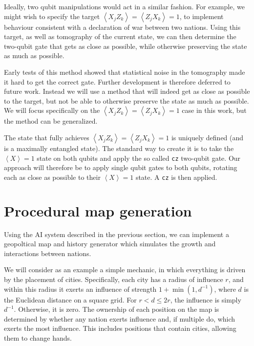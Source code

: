 \documentclass[conference]{IEEEtran}
\begin{document}
Ideally, two qubit manipulations would act in a similar fashion. For example, we might wish to specify the target $\left\langle X_j Z_k\right\rangle=\left\langle Z_j X_k \right\rangle=1$, to implement behaviour consistent with a declaration of war between two nations. Using this target, as well as tomography of the current state, we can then determine the two-qubit gate that gets as close as possible, while otherwise preserving the state as much as possible.

Early tests of this method showed that statistical noise in the tomography made it hard to get the correct gate. Further development is therefore deferred to future work. Instead we will use a method that will indeed get as close as possible to the target, but not be able to otherwise preserve the state as much as possible. We will focus specifically on the $\left\langle X_j Z_k\right\rangle=\left\langle Z_j X_k\right\rangle=1$ case in this work, but the method can be generalized.

The state that fully achieves $\left\langle X_j Z_k \right\rangle=\left\langle Z_j X_k\right\rangle=1$ is uniquely defined (and is a maximally entangled state). The standard way to create it is to take the $\left\langle X\right\rangle=1$ state on both qubits and apply the so called \texttt{cz} two-qubit gate. Our approach will therefore be to apply single qubit gates to both qubits, rotating each as close as possible to their $\left\langle X\right\rangle=1$ state. A \texttt{cz} is then applied.



\section{Procedural map generation}

Using the AI system described in the previous section, we can implement a geopoltical map and history generator which simulates the growth and interactions between nations.

We will consider as an example a simple mechanic, in which everything is driven by the placement of cities. Specifically, each city has a radius of influence $r$, and within this radius it exerts an influence of strength $1+\min(1,d^{-1})$, where $d$ is the Euclidean distance on a square grid. For $ r< d \leq 2r$, the influence is simply $d^{-1}$. Otherwise, it is zero. The ownership of each position on the map is determined by whether any nation exerts influence and, if multiple do, which exerts the most influence. This includes positions that contain cities, allowing them to change hands.
\end{document}
